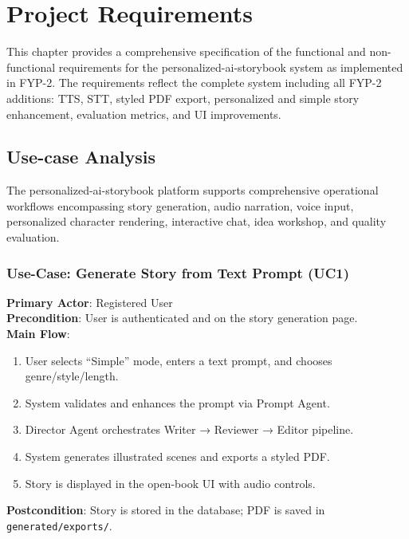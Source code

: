 \chapter{Project Requirements}
\label{sec:requirements}

This chapter provides a comprehensive specification of the functional and non-functional requirements for the personalized-ai-storybook system as implemented in FYP-2. The requirements reflect the complete system including all FYP-2 additions: TTS, STT, styled PDF export, personalized and simple story enhancement, evaluation metrics, and UI improvements.

\section{Use-case Analysis}

The personalized-ai-storybook platform supports comprehensive operational workflows encompassing story generation, audio narration, voice input, personalized character rendering, interactive chat, idea workshop, and quality evaluation.

\subsection{Use-Case: Generate Story from Text Prompt (UC1)}
\textbf{Primary Actor}: Registered User \\
\textbf{Precondition}: User is authenticated and on the story generation page. \\
\textbf{Main Flow}:
\begin{enumerate}
    \item User selects ``Simple'' mode, enters a text prompt, and chooses genre/style/length.
    \item System validates and enhances the prompt via Prompt Agent.
    \item Director Agent orchestrates Writer → Reviewer → Editor pipeline.
    \item System generates illustrated scenes and exports a styled PDF.
    \item Story is displayed in the open-book UI with audio controls.
\end{enumerate}
\textbf{Postcondition}: Story is stored in the database; PDF is saved in \texttt{generated/exports/}.

